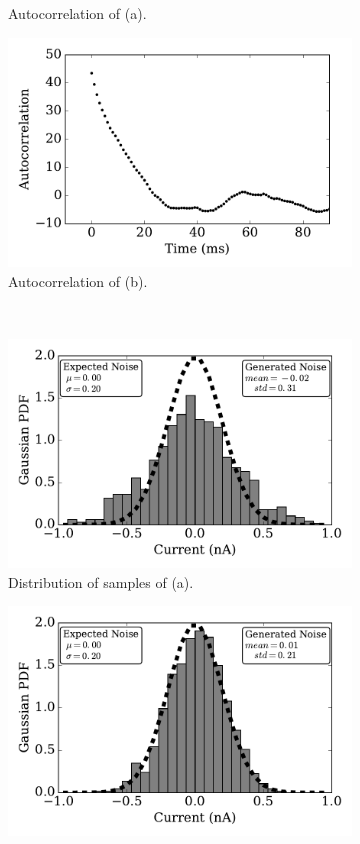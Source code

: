 \begin{figure}[tbp!]
\begin{subfigure}[t]{0.43\textwidth}
			\caption{Autocorrelation of (a).}
		\end{subfigure}
		\begin{subfigure}[t]{0.43\textwidth}
			\includegraphics[width=\textwidth]{pics_iconip/autocorr_tau10.pdf}
			\caption{Autocorrelation of (b).}
		\end{subfigure}\\
		\begin{subfigure}[t]{0.43\textwidth}
			\includegraphics[width=\textwidth]{pics_iconip/distr_tau1.pdf}
			\caption{Distribution of samples of (a).}
		\end{subfigure}
		\begin{subfigure}[t]{0.43\textwidth}
			\includegraphics[width=\textwidth]{pics_iconip/distr_tau10.pdf}

\end{subfigure}
\end{figure}
